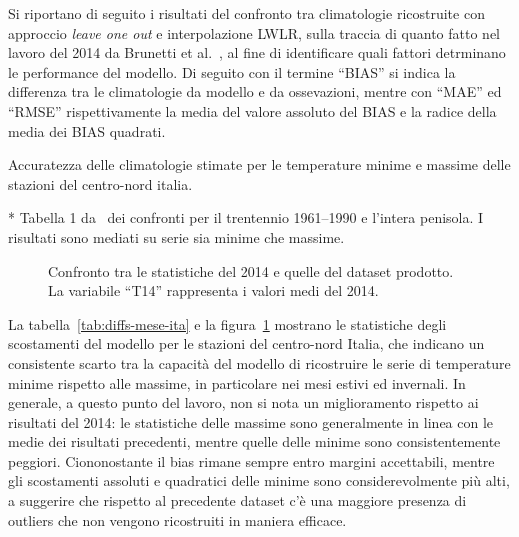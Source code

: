 Si riportano di seguito i risultati del confronto tra climatologie ricostruite con approccio \emph{leave one out} e interpolazione LWLR, sulla traccia di quanto fatto nel lavoro del 2014 da Brunetti et al.~\cite{brunettiHighresolutionTemperatureClimatology2014}, al fine di identificare quali fattori detrminano le performance del modello. Di seguito con il termine ``BIAS'' si indica la differenza tra le climatologie da modello e da ossevazioni, mentre con ``MAE'' ed ``RMSE'' rispettivamente la media del valore assoluto del BIAS e la radice della media dei BIAS quadrati.

\begin{table}[ht]
  \centering
  \begin{adjustbox}{max width=\textwidth}
    \begin{threeparttable}
      \caption{Accuratezza delle climatologie stimate per le temperature minime e massime delle stazioni del centro-nord italia.}\label{tab:diffs-mese-ita}
      
      \begin{tablenotes}
      \item[*] Tabella 1 da~\cite[p.~10]{brunettiHighresolutionTemperatureClimatology2014} dei confronti per il trentennio 1961--1990 e l'intera penisola. I risultati sono mediati su serie sia minime che massime.
      \end{tablenotes}
    \end{threeparttable}
  \end{adjustbox}
\end{table}

\begin{figure}[ht]
  \centering
  
  \caption{Confronto tra le statistiche del 2014 e quelle del dataset prodotto. La variabile ``T14'' rappresenta i valori medi del 2014.}\label{fig:diffs-mese-ita}
\end{figure}
La tabella~\ref{tab:diffs-mese-ita} e la figura~\ref{fig:diffs-mese-ita} mostrano le statistiche degli scostamenti del modello per le stazioni del centro-nord Italia, che indicano un consistente scarto tra la capacità del modello di ricostruire le serie di temperature minime rispetto alle massime, in particolare nei mesi estivi ed invernali. In generale, a questo punto del lavoro, non si nota un miglioramento rispetto ai risultati del 2014: le statistiche delle massime sono generalmente in linea con le medie dei risultati precedenti, mentre quelle delle minime sono consistentemente peggiori. Ciononostante il bias rimane sempre entro margini accettabili, mentre gli scostamenti assoluti e quadratici delle minime sono considerevolmente più alti, a suggerire che rispetto al precedente dataset c'è una maggiore presenza di outliers che non vengono ricostruiti in maniera efficace.

